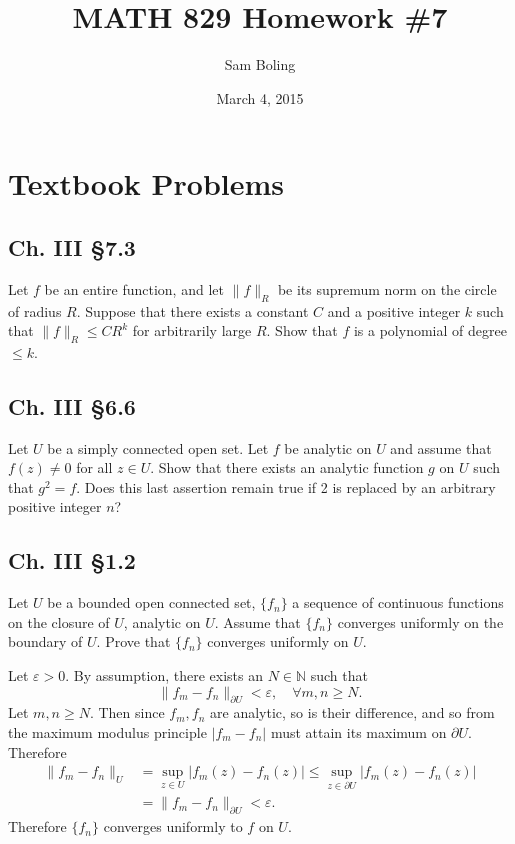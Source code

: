 \documentclass{article}
\title{MATH 829 Homework \#7}
\date{March 4, 2015}
\author{Sam Boling}
\newcommand\horline{\noindent\makebox[\linewidth]{\rule{\textwidth}{0.4pt}}}
\newcounter{Problem}
\begin{document}
\begin{titlepage}
\maketitle
\end{titlepage}

\section{Textbook Problems}
\subsection*{Ch. III \S 7.3}
Let $f$ be an entire function, and let $\|f\|_R$ be its supremum
norm on the circle of radius $R$. Suppose that there exists a
constant $C$ and a positive integer $k$ such that
$\|f\|_R \leq C R^k$ for arbitrarily large $R$. Show that $f$ is a
polynomial of degree $\leq k$.

\horline

\subsection*{Ch. III \S 6.6}
Let $U$ be a simply connected open set. Let $f$ be analytic on
$U$ and assume that $f(z) \neq 0$ for all $z \in U$. Show that there
exists an analytic function $g$ on $U$ such that $g^2 = f$. Does this
last assertion remain true if 2 is replaced by an arbitrary positive
integer $n$?

\horline



\subsection*{Ch. III \S 1.2}
Let $U$ be a bounded open connected set, $\{f_n\}$ a sequence of
continuous functions on the closure of $U$, analytic on $U$. Assume
that $\{f_n\}$ converges uniformly on the boundary of $U$. Prove that
$\{f_n\}$ converges uniformly on $U$.

\horline

Let $\varepsilon > 0$. 
By assumption, there exists an $N \in \mathbb{N}$ such that
$$
\| f_m - f_n \|_{\partial U} < \varepsilon, \quad
\forall m, n \geq N.
$$
Let $m, n \geq N$. Then since $f_m, f_n$ are analytic, so is their difference, and so from
the maximum modulus principle $|f_m - f_n|$ must attain its maximum on
$\partial U$. Therefore 
\begin{align*}
     \| f_m - f_n \|_U 
&=    \sup_{z \in U} |f_m(z) - f_n(z)|
 \leq \sup_{z \in \partial U} |f_m(z) - f_n(z)| \\
&=    \| f_m - f_n \|_{\partial U}
 <    \varepsilon.
\end{align*}
Therefore $\{ f_n \}$ converges uniformly to $f$ on $U$.
\end{document}
